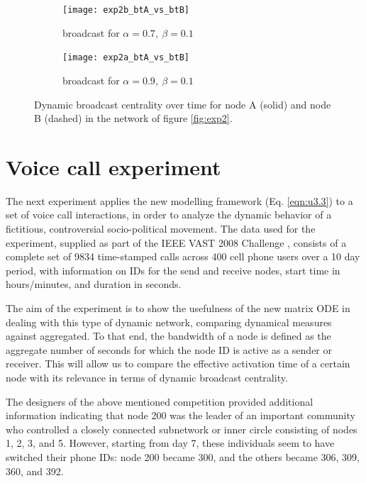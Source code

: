 \begin{figure}
     \centering
     \begin{subfigure}[b]{0.49\textwidth}
         \centering
         \texttt{[image: exp2b\_btA\_vs\_btB]}
         \caption{broadcast for $\alpha = 0.7 ,~\beta = 0.1$}
         \label{fig:bt5}
     \end{subfigure}
     \hfill
     \begin{subfigure}[b]{0.49\textwidth}
         \centering
         \texttt{[image: exp2a\_btA\_vs\_btB]}
         \caption{broadcast for $\alpha = 0.9 ,~\beta = 0.1$}
         \label{fig:bt6}
     \end{subfigure}
     \caption{Dynamic broadcast centrality over time for node A (solid) and node B (dashed) in the network of figure \ref{fig:exp2}.}
     \label{fig:twobt}
\end{figure}

\section{Voice call experiment}
\label{sec:voicecall}
The next experiment applies the new modelling framework (Eq. \ref{eqn:u3.3}) to a set of voice call interactions, in order to analyze the dynamic behavior of a fictitious, controversial socio-political movement. The data used for the experiment, supplied as part of the IEEE VAST 2008 Challenge \cite{grinstein2008vast}, consists of a complete set of 9834 time-stamped calls across 400 cell phone users over a 10 day period, with information on IDs for the send and receive nodes, start time in hours/minutes, and duration in seconds.

The aim of the experiment is to show the usefulness of the new matrix ODE in dealing with this type of dynamic network, comparing dynamical measures against aggregated. To that end, the bandwidth of a node is defined as the aggregate number of seconds for which the node ID is active as a sender or receiver. This will allow us to compare the effective activation time of a certain node with its relevance in terms of dynamic broadcast centrality.

The designers of the above mentioned competition provided additional information indicating that node 200 was the leader of an important community who controlled a closely connected subnetwork or inner circle consisting of nodes 1, 2, 3, and 5. However, starting from day 7, these individuals seem to have switched their phone IDs: node 200 became 300, and the others became 306, 309, 360, and 392.

